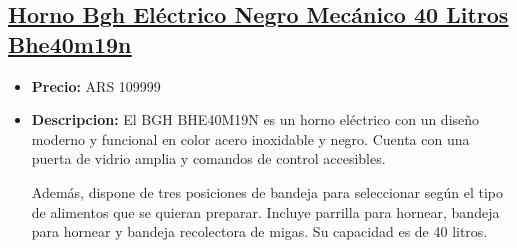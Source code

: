\documentclass{article}
\begin{document}
\begin{adjustwidth}{2em}{}
    \vspace{1\baselineskip} %
    \end{adjustwidth}

    
    \begin{adjustwidth}{2em}{}

    \subsection{\underline{\href{https://www.mercadolibre.com.ar/horno-bgh-electrico-negro-mecanico-40-litros-bhe40m19n/p/MLA14960487}{Horno Bgh Eléctrico Negro Mecánico 40 Litros Bhe40m19n}}}
    \begin{itemize}
        \item \textbf{Precio:} ARS 109999
        \item \textbf{Descripcion:} El BGH BHE40M19N es un horno eléctrico con un diseño moderno y funcional en color acero inoxidable y negro. Cuenta con una puerta de vidrio amplia y comandos de control accesibles.

Además, dispone de tres posiciones de bandeja para seleccionar según el tipo de alimentos que se quieran preparar. Incluye parrilla para hornear, bandeja para hornear y bandeja recolectora de migas. Su capacidad es de 40 litros.


\end{itemize}
\end{adjustwidth}
\end{document}
